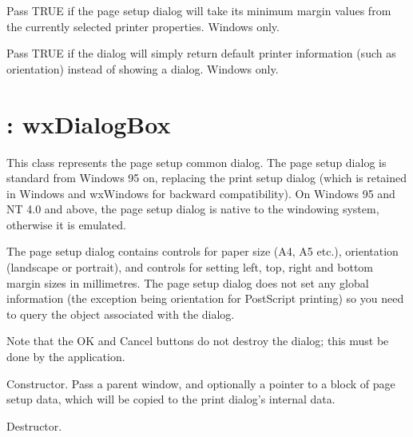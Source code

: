 Pass TRUE if the page setup dialog will take its minimum margin values from the currently
selected printer properties. Windows only.



Pass TRUE if the dialog will simply return default printer information (such as orientation)
instead of showing a dialog. Windows only.

\section{: wxDialogBox}\label{wxpagesetupdialog}

This class represents the page setup common dialog. The page setup dialog is standard from
Windows 95 on, replacing the print setup dialog (which is retained in Windows and wxWindows
for backward compatibility). On Windows 95 and NT 4.0 and above, the page setup dialog is
native to the windowing system, otherwise it is emulated.

The page setup dialog contains controls for paper size (A4, A5 etc.), orientation (landscape
or portrait), and controls for setting left, top, right and bottom margin sizes in millimetres.
The page setup dialog does not set any global information (the exception being orientation
for PostScript printing) so you need to query the  object
associated with the dialog.

Note that the OK and Cancel buttons do not destroy the dialog; this must be done by the
application.



Constructor. Pass a parent window, and optionally a pointer to a block of page setup
data, which will be copied to the print dialog's internal data.



Destructor.




